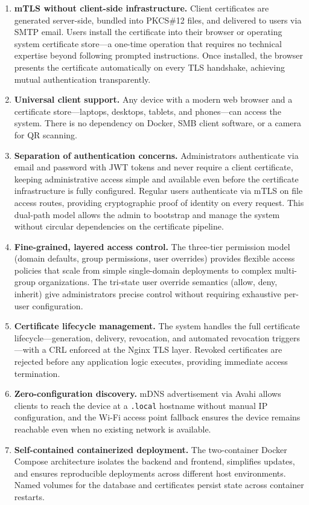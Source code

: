 \documentclass[12pt,letterpaper]{report}
\begin{document}
\begin{enumerate}
    \item \textbf{mTLS without client-side infrastructure.} Client certificates are generated server-side, bundled into PKCS\#12 files, and delivered to users via SMTP email. Users install the certificate into their browser or operating system certificate store---a one-time operation that requires no technical expertise beyond following prompted instructions. Once installed, the browser presents the certificate automatically on every TLS handshake, achieving mutual authentication transparently.

    \item \textbf{Universal client support.} Any device with a modern web browser and a certificate store---laptops, desktops, tablets, and phones---can access the system. There is no dependency on Docker, SMB client software, or a camera for QR scanning.

    \item \textbf{Separation of authentication concerns.} Administrators authenticate via email and password with JWT tokens and never require a client certificate, keeping administrative access simple and available even before the certificate infrastructure is fully configured. Regular users authenticate via mTLS on file access routes, providing cryptographic proof of identity on every request. This dual-path model allows the admin to bootstrap and manage the system without circular dependencies on the certificate pipeline.

    \item \textbf{Fine-grained, layered access control.} The three-tier permission model (domain defaults, group permissions, user overrides) provides flexible access policies that scale from simple single-domain deployments to complex multi-group organizations. The tri-state user override semantics (allow, deny, inherit) give administrators precise control without requiring exhaustive per-user configuration.

    \item \textbf{Certificate lifecycle management.} The system handles the full certificate lifecycle---generation, delivery, revocation, and automated revocation triggers---with a CRL enforced at the Nginx TLS layer. Revoked certificates are rejected before any application logic executes, providing immediate access termination.

    \item \textbf{Zero-configuration discovery.} mDNS advertisement via Avahi allows clients to reach the device at a \texttt{.local} hostname without manual IP configuration, and the Wi-Fi access point fallback ensures the device remains reachable even when no existing network is available.

    \item \textbf{Self-contained containerized deployment.} The two-container Docker Compose architecture isolates the backend and frontend, simplifies updates, and ensures reproducible deployments across different host environments. Named volumes for the database and certificates persist state across container restarts.
\end{enumerate}
\end{document}
